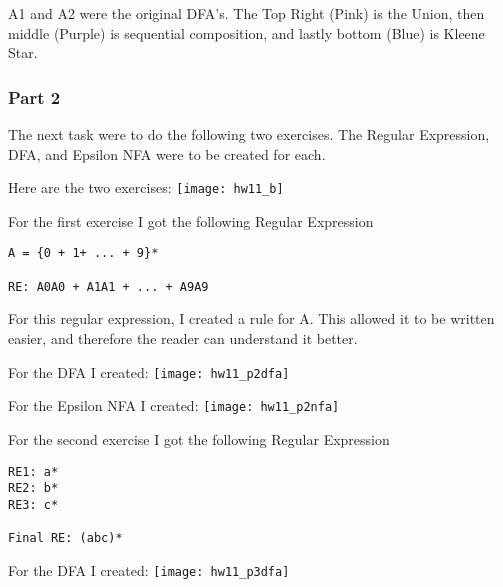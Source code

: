 \documentclass{article}
\theoremstyle{theorem}
\theoremstyle{definition}
\theoremstyle{remark}
\begin{document}
\noindent\newline A1 and A2 were the original DFA's. The Top Right (Pink) is the Union, then middle (Purple) is sequential composition, and lastly bottom (Blue) is Kleene Star.

\subsubsection{Part 2}
\noindent\newline The next task were to do the following two exercises. The Regular Expression, DFA, and Epsilon NFA were to be created for each.

\noindent\newline Here are the two exercises:\newline
\texttt{[image: hw11\_b]}

\noindent\newline\newline For the first exercise I got the following Regular Expression
\begin{verbatim}
A = {0 + 1+ ... + 9}*

RE: A0A0 + A1A1 + ... + A9A9
\end{verbatim}

\noindent\newline For this regular expression, I created a rule for A. This allowed it to be written easier, and therefore the reader can understand it better.

\noindent\newline\newline For the DFA I created:\newline
\texttt{[image: hw11\_p2dfa]}

\noindent\newline\newline For the Epsilon NFA I created:\newline
\texttt{[image: hw11\_p2nfa]}

\noindent\newline\newline For the second exercise I got the following Regular Expression
\begin{verbatim}
RE1: a*
RE2: b*
RE3: c*

Final RE: (abc)*
\end{verbatim}

\noindent\newline\newline For the DFA I created:\newline
\texttt{[image: hw11\_p3dfa]}
\end{document}

